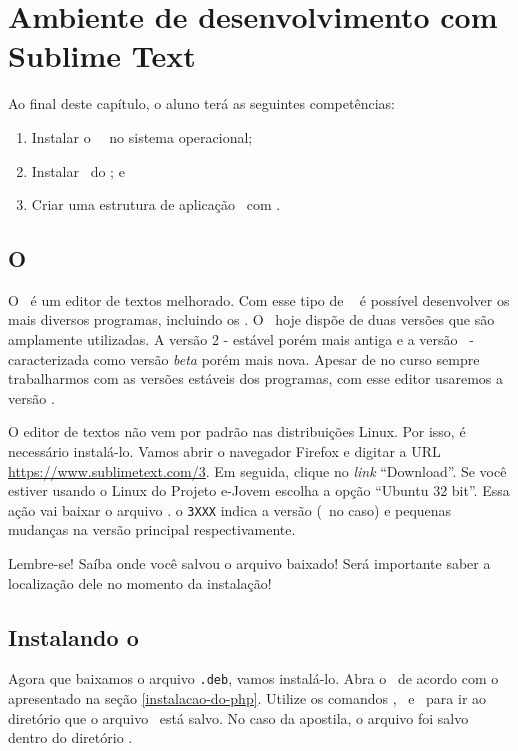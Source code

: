 \chapter{Ambiente de desenvolvimento com Sublime Text}
\label{cap2}

Ao final deste capítulo, o aluno terá as seguintes competências:
\begin{enumerate}
	\item Instalar o \sublime~\sublimeversao~no sistema operacional;
	\item Instalar \plugins~do \sublime; e
	\item Criar uma estrutura de aplicação \web~com \php. 
\end{enumerate}

\section{O \sublime}
\label{o-sublime}

O \sublime~é um editor de textos melhorado. Com esse tipo de \software~
é possível desenvolver os mais diversos programas, incluindo os \sites. 
O \sublime~hoje dispõe de duas versões que são amplamente utilizadas. 
A versão 2 - estável porém mais antiga e a versão \sublimeversao~- caracterizada como 
versão \textit{beta} porém mais nova. Apesar de no curso sempre trabalharmos com 
as versões estáveis dos programas, com esse editor usaremos a versão \sublimeversao.

O editor de textos não vem por padrão nas distribuições Linux. Por isso, é necessário instalá-lo. 
Vamos abrir o navegador Firefox e digitar a URL \url{https://www.sublimetext.com/3}.
Em seguida, clique no \textit{link} ``Download''. Se você estiver usando o Linux do Projeto e-Jovem
escolha a opção ``Ubuntu 32 bit''. Essa ação vai baixar o arquivo \sublimefilename.
o \texttt{3XXX} indica a versão (\sublimeversao~no caso) e pequenas mudanças na 
versão principal respectivamente.

Lembre-se! Saíba onde você salvou o arquivo baixado! Será importante saber a 
localização dele no momento da instalação!

\section{Instalando o \sublime}
\label{instalando-o-sublime}

Agora que baixamos o arquivo \texttt{.deb}, vamos instalá-lo. Abra o \terminal~de acordo
com o apresentado na seção \ref{instalacao-do-php}. Utilize os comandos \comandocdcompleto, 
\comandolscompleto~e \comandopwdcompleto~para ir ao diretório que o arquivo 
\sublimefilename~está salvo. No caso da apostila, o arquivo foi salvo dentro do 
diretório .

